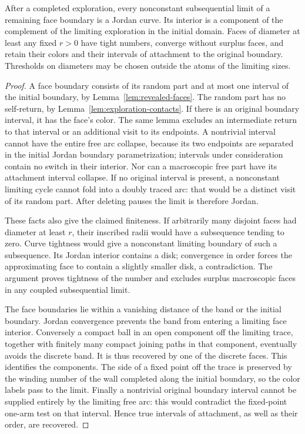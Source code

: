 \begin{lemma}
\label{lem:face-convergence}
After a completed exploration, every nonconstant subsequential limit
of a remaining face boundary is a Jordan curve.  Its interior is a
component of the complement of the limiting exploration in the
initial domain.  Faces of diameter at least any fixed $r>0$ have tight
numbers, converge without surplus faces, and retain their colors and
their intervals of attachment to the original boundary.  Thresholds
on diameters may be chosen outside the atoms of the limiting sizes.
\end{lemma}

\begin{proof}
A face boundary consists of its random part and at most one interval
of the initial boundary, by Lemma~\ref{lem:revealed-faces}.  The random
part has no self-return, by Lemma~\ref{lem:exploration-contacts}.  If
there is an original boundary interval, it has the face's color.  The
same lemma excludes an intermediate return to that interval or an
additional visit to its endpoints.  A nontrivial interval cannot have
the entire free arc collapse, because its two endpoints are separated
in the initial Jordan boundary parametrization; intervals under
consideration contain no switch in their interior.  Nor can a
macroscopic free part have its attachment interval collapse.  If no
original interval is present, a nonconstant limiting cycle cannot
fold into a doubly traced arc: that would be a distinct visit of its
random part.  After deleting pauses the limit is therefore Jordan.

These facts also give the claimed finiteness.  If arbitrarily many
disjoint faces had diameter at least $r$, their inscribed radii would
have a subsequence tending to zero.  Curve tightness would give a
nonconstant limiting boundary of such a subsequence.  Its Jordan
interior contains a disk; convergence in order forces the
approximating face to contain a slightly smaller disk, a contradiction.
The argument proves tightness of the number and excludes surplus
macroscopic faces in any coupled subsequential limit.

The face boundaries lie within a vanishing distance of the band or
the initial boundary.  Jordan convergence prevents the band from
entering a limiting face interior.  Conversely a compact ball in an
open component off the limiting trace, together with finitely many
compact joining paths in that component, eventually avoids the
discrete band.  It is thus recovered by one of the discrete faces.
This identifies the components.  The side of a fixed point off the
trace is preserved by the winding number of the wall completed along
the initial boundary, so the color labels pass to the limit.  Finally
a nontrivial original boundary interval cannot be supplied entirely
by the limiting free arc: this would contradict the fixed-point
one-arm test on that interval.  Hence true intervals of attachment,
as well as their order, are recovered.
\end{proof}

